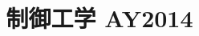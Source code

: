 \documentclass[11pt,a4paper]{article}
\title{制御工学 AY2014}
\author{}
\date{}
\begin{document}
\maketitle


\bigskip

\end{document}
